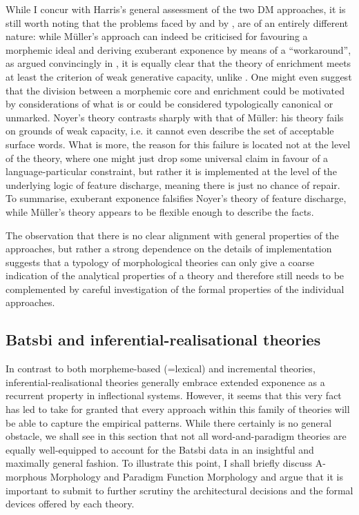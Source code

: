 \documentclass[output=paper]{langsci/langscibook}
\begin{document}
While I concur with Harris's general assessment of the two DM
approaches, it is still worth noting that the problems faced by
\citet{Noyer92} and by \citet{MuellerGereon07}, are of an
entirely different nature: while  Müller's approach can indeed be
criticised for favouring a morphemic ideal and deriving exuberant
exponence by means of a ``workaround'', as argued convincingly in
\citet{Harris09}, it is equally clear that the theory of enrichment
meets at least the criterion of weak generative capacity, unlike
\citet{Noyer92}. One might even suggest that the division between a
morphemic core and enrichment could be motivated by considerations of
what is or could be considered typologically canonical or
unmarked. Noyer's theory contrasts sharply with that of Müller: 
his theory fails on grounds of weak capacity, i.e. it cannot even
describe the set of acceptable surface words. What is more, the reason for this
failure is located not at the level of the theory, where one might
just drop some universal claim in favour of a language-particular
constraint, but rather it is implemented at the level of the
underlying logic of feature discharge, meaning there is just no chance
of repair. To summarise, exuberant exponence falsifies Noyer's theory
of feature discharge, while Müller's theory appears to be flexible
enough to describe the facts.\largerpage[-1]

The observation that there is no clear alignment with general
properties of the approaches, but rather a strong dependence on the
details of implementation suggests that a typology of morphological
theories can only give a coarse indication of the analytical
properties of a theory and therefore still needs to be complemented by
careful investigation of the formal properties of the individual
approaches.
      

\subsection{Batsbi and inferential-realisational theories}

In contrast to both morpheme-based (=lexical) and incremental
theories, in\-feren\-tial-realisa\-tional theories generally embrace
extended exponence as a recurrent property in inflectional systems.
However, it seems that this very fact has led \citet{Harris09} to take
for granted that every approach within this family of theories will be
able to capture the empirical patterns. While there certainly is no
general obstacle, we shall see in this section that not all
word-and-paradigm theories are equally well-equipped to account for
the Batsbi data in an insightful and maximally general fashion. To
illustrate this point, I shall briefly discuss A-morphous Morphology
\citep[=AM;][]{Anderson92} and Paradigm Function Morphology
\citep[=PFM;][]{Stump01} and argue that it is important to submit to
further scrutiny the architectural decisions and the formal devices
offered by each theory.
\end{document}
